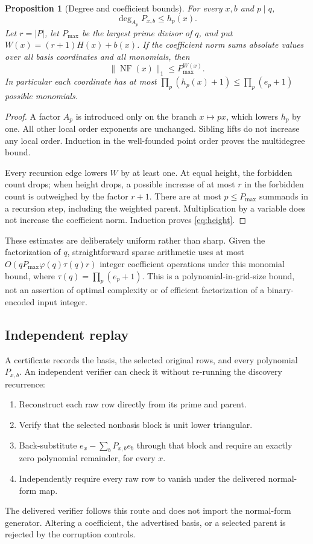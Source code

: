 \documentclass[11pt]{article}
\numberwithin{equation}{section}
\newtheorem{proposition}[theorem]{Proposition}
\theoremstyle{definition}
\theoremstyle{remark}
\DeclareMathOperator{\NF}{NF}
\begin{document}
\begin{proposition}[Degree and coefficient bounds]
\label{prop:bounds}
For every $x,b$ and $p\mid q$,
\[
 \deg_{A_p}P_{x,b}\le h_p(x).
\]
Let $r=|P|$, let $P_{\max}$ be the largest prime divisor of $q$, and put
$W(x)=(r+1)H(x)+b(x)$. If the coefficient norm sums absolute values over
all basis coordinates and all monomials, then
\begin{equation}
 \|\NF(x)\|_1\le P_{\max}^{W(x)}.
 \label{eq:height}
\end{equation}
In particular each coordinate has at most
$\prod_p(h_p(x)+1)\le\prod_p(e_p+1)$ possible monomials.
\end{proposition}
\begin{proof}
A factor $A_p$ is introduced only on the branch $x\mapsto px$, which
lowers $h_p$ by one. All other local order exponents are unchanged.
Sibling lifts do not increase any local order. Induction in the
well-founded point order proves the multidegree bound.

Every recursion edge lowers $W$ by at least one. At equal height, the
forbidden count drops; when height drops, a possible increase of at most
$r$ in the forbidden count is outweighed by the factor $r+1$.
There are at most $p\le P_{\max}$ summands in a recursion step, including
the weighted parent. Multiplication by a variable does not increase the
coefficient norm. Induction proves \eqref{eq:height}.
\end{proof}

These estimates are deliberately uniform rather than sharp. Given the
factorization of $q$, straightforward sparse arithmetic uses at most
$O(qP_{\max}\varphi(q)\tau(q)r)$ integer coefficient operations under
this monomial bound, where $\tau(q)=\prod_p(e_p+1)$. This is a
polynomial-in-grid-size bound, not an assertion of optimal complexity
or of efficient factorization of a binary-encoded input integer.

\subsection{Independent replay}
A certificate records the basis, the selected original rows, and every
polynomial $P_{x,b}$. An independent verifier can check it without
re-running the discovery recurrence:
\begin{enumerate}[nosep]
\item Reconstruct each raw row directly from its prime and parent.
\item Verify that the selected nonbasis block is unit lower triangular.
\item Back-substitute $e_x-\sum_bP_{x,b}e_b$ through that block and require
an exactly zero polynomial remainder, for every $x$.
\item Independently require every raw row to vanish under the delivered
normal-form map.
\end{enumerate}
The delivered verifier follows this route and does not import the
normal-form generator. Altering a coefficient, the advertised basis, or
a selected parent is rejected by the corruption controls.
\end{document}
